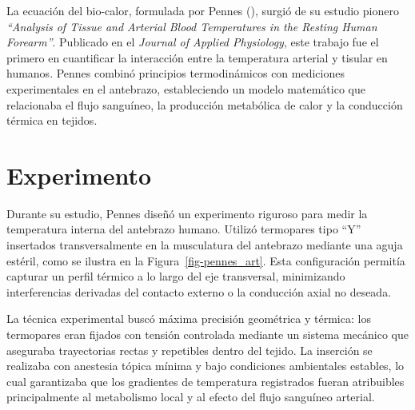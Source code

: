 \documentclass[
  spanish,
  us-letterpaper,
  DIV=11,
  numbers=noendperiod]{scrreprt}
\theoremstyle{definition}
\theoremstyle{plain}
\theoremstyle{remark}
\begin{document}
La ecuación del bio-calor, formulada por Pennes
(), surgió de su estudio pionero
\emph{``Analysis of Tissue and Arterial Blood Temperatures in the
Resting Human Forearm''}. Publicado en el \emph{Journal of Applied
Physiology}, este trabajo fue el primero en cuantificar la interacción
entre la temperatura arterial y tisular en humanos. Pennes combinó
principios termodinámicos con mediciones experimentales en el antebrazo,
estableciendo un modelo matemático que relacionaba el flujo sanguíneo,
la producción metabólica de calor y la conducción térmica en tejidos.

\section*{Experimento}\label{experimento}


Durante su estudio, Pennes diseñó un experimento riguroso para medir la
temperatura interna del antebrazo humano. Utilizó termopares tipo ``Y''
insertados transversalmente en la musculatura del antebrazo mediante una
aguja estéril, como se ilustra en la Figura~\ref{fig-pennes_art}. Esta
configuración permitía capturar un perfil térmico a lo largo del eje
transversal, minimizando interferencias derivadas del contacto externo o
la conducción axial no deseada.

La técnica experimental buscó máxima precisión geométrica y térmica: los
termopares eran fijados con tensión controlada mediante un sistema
mecánico que aseguraba trayectorias rectas y repetibles dentro del
tejido. La inserción se realizaba con anestesia tópica mínima y bajo
condiciones ambientales estables, lo cual garantizaba que los gradientes
de temperatura registrados fueran atribuibles principalmente al
metabolismo local y al efecto del flujo sanguíneo arterial.
\end{document}
